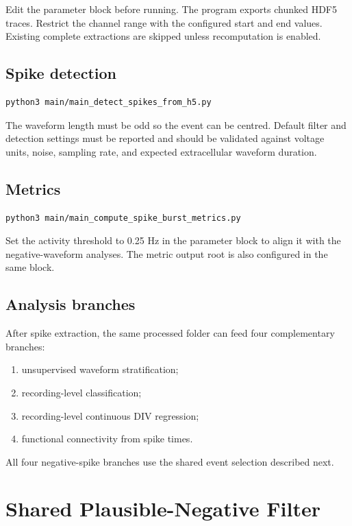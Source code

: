 \documentclass[11pt,a4paper]{article}
\begin{document}
Edit the parameter block before running. The program exports chunked HDF5
traces. Restrict the channel range with the configured start and end values.
Existing complete extractions are skipped unless recomputation is enabled.

\subsection{Spike detection}

\begin{lstlisting}
python3 main/main_detect_spikes_from_h5.py
\end{lstlisting}

The waveform length must be odd so the event can be centred. Default filter and
detection settings must be reported and should be validated against voltage
units, noise, sampling rate, and expected extracellular waveform duration.

\subsection{Metrics}

\begin{lstlisting}
python3 main/main_compute_spike_burst_metrics.py
\end{lstlisting}

Set the activity threshold to 0.25 Hz in the parameter block to align it with
the negative-waveform analyses. The metric output root is also configured in
the same block.

\subsection{Analysis branches}

After spike extraction, the same processed folder can feed four complementary
branches:

\begin{enumerate}
  \item unsupervised waveform stratification;
  \item recording-level classification;
  \item recording-level continuous DIV regression;
  \item functional connectivity from spike times.
\end{enumerate}

All four negative-spike branches use the shared event selection described next.

\section{Shared Plausible-Negative Filter}
\end{document}
